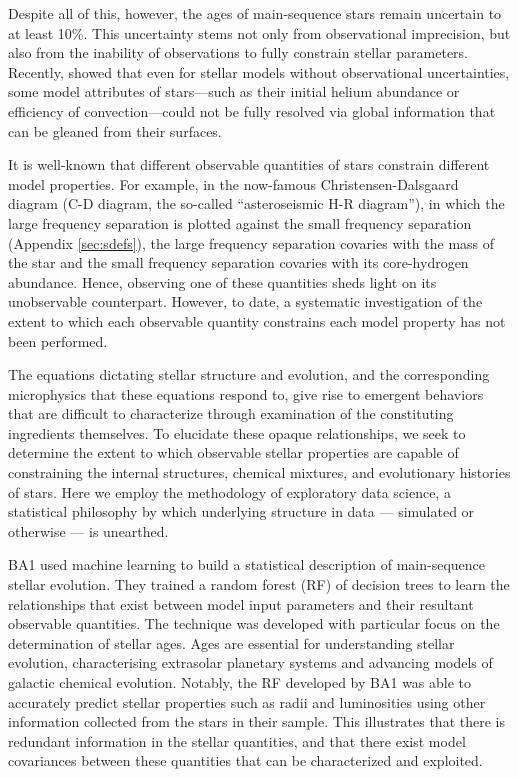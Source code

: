Despite all of this, however, the ages of main-sequence stars remain uncertain to at least 10\%. This uncertainty stems not only from observational imprecision, but also from the inability of observations to fully constrain stellar parameters.  
Recently, \citet{2016apj...830...31b} showed that even for stellar models without observational uncertainties, some model attributes of stars---such as their initial helium abundance or efficiency of convection---could not be fully resolved via global information that can be gleaned from their surfaces. 


It is well-known that different observable quantities of stars constrain different model properties. For example, in the now-famous Christensen-Dalsgaard diagram (C-D diagram, the so-called ``asteroseismic H-R diagram''), in which the large frequency separation is plotted against the small frequency separation (Appendix \ref{sec:sdefs}), the large frequency separation covaries with the mass of the star and the small frequency separation covaries with its core-hydrogen abundance. Hence, observing one of these quantities sheds light on its unobservable counterpart.
However, to date, a systematic investigation of the extent to which each observable quantity constrains each model property has not been performed.

The equations dictating stellar structure and evolution, and the corresponding microphysics that these equations respond to, give rise to emergent behaviors that are difficult to characterize through examination of the constituting ingredients themselves. To elucidate these opaque relationships, we seek to determine the extent to which observable stellar properties are capable of constraining the internal structures, chemical mixtures, and evolutionary histories of stars. Here we employ the methodology of exploratory data science, a statistical philosophy by which underlying structure in data --- simulated or otherwise --- is unearthed.



BA1 used machine learning to build a statistical description of main-sequence stellar evolution. They trained a random forest (RF) of decision trees to learn the relationships that exist between model input parameters and their resultant observable quantities. The technique was developed with particular focus on the determination of stellar ages.  Ages are essential for understanding stellar evolution, characterising extrasolar planetary systems and advancing models of galactic chemical evolution. 
Notably, the RF developed by BA1 was able to accurately predict stellar properties such as radii and luminosities using other information collected from the stars in their sample. This illustrates that there is redundant information in the stellar quantities, and that there exist model covariances between these quantities that can be characterized and exploited. 



